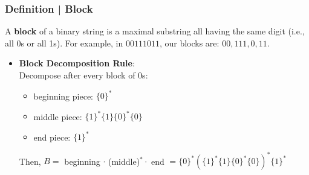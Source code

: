 \documentclass{report}
\begin{document}
\subsubsection{Definition | Block}
A \textbf{block} of a binary string is a maximal substring all having the same digit (i.e., all 0s or all 1s). For example, in $00111011$, our blocks are: $00, 111, 0, 11$.
\begin{itemize}
\item \textbf{Block Decomposition Rule}:\\
Decompose after every block of 0s:
\begin{itemize}
\item beginning piece: $\{0\}^*$
\item middle piece: $\{1\}^*\{1\}\{0\}^*\{0\}$
\item end piece: $\{1\}^*$
\end{itemize}
Then, $B =$ beginning $\cdot$ (middle)$^* \cdot$ end $= \{0\}^*{\left(\{1\}^*\{1\}\{0\}^*\{0\}\right)}^*\{1\}^*$
\end{itemize}
\end{document}
